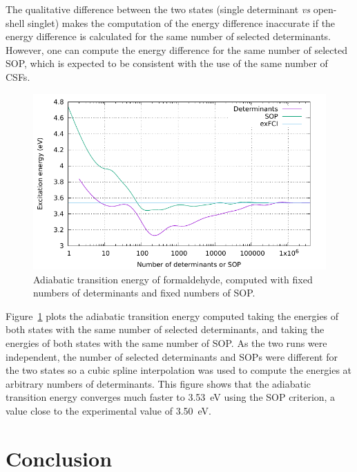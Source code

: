 \documentclass[aip,jcp,reprint,showkeys]{revtex4-1}
\newcommand{\sop}{SOP}
\newcommand{\csf}{CSF}
\begin{document}
The qualitative difference between the two states (single determinant
\textit{vs} open-shell singlet) makes the computation of
the energy difference inaccurate if the energy difference is calculated for
the same number of selected determinants. 
However, one can compute the energy difference for the same number of selected
\sop, which is expected to be consistent with the use of the same number of
\csf s.

\begin{figure}
\includegraphics[width=0.9\columnwidth]{formaldehyde}
\caption{Adiabatic transition energy of formaldehyde, computed with fixed numbers of 
determinants and fixed numbers of \sop .}
\label{fig:formaldehyde}
\end{figure}

Figure~\ref{fig:formaldehyde} plots the adiabatic transition energy computed
taking the energies of both states with the same number of selected
determinants, and taking the energies of both states with the same number of
\sop{}.
As the two runs were independent, the number of selected determinants and
\sop s were different for the two states so a cubic spline interpolation
was used to compute the energies at arbitrary numbers of determinants.
This figure shows that the adiabatic transition energy converges much
faster to 3.53~eV using the \sop{} criterion, a value close to the
experimental value of 3.50~eV.\cite{Clouthier_1983,Angeli_2005}


\section{Conclusion}
\end{document}
